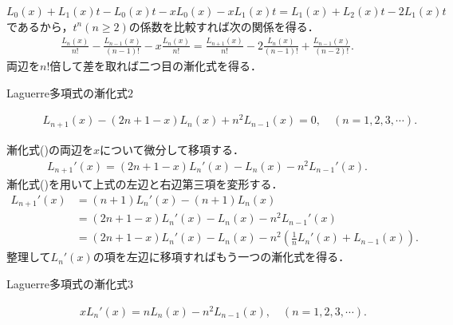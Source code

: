 \documentclass[a4j,papersize,disablejfam,slide,14pt]{jsarticle}
\begin{document}
    $L_0(x) + L_1(x) t - L_0(x) t - x L_0(x) - x L_1(x)t = L_1(x) + L_2(x)t - 2L_1(x)t$であるから，$t^n(n \geq 2)$の係数を比較すれば次の関係を得る．
    \begin{align}
    	\frac{L_n(x)}{n!} - \frac{L_{n-1}(x)}{(n-1)!} - x \frac{L_n(x)}{n!} = \frac{L_{n+1}(x)}{n!} - 2 \frac{L_n(x)}{(n-1)!} + \frac{L_{n-1}(x)}{(n-2)!}.
    \end{align}
    両辺を$n!$倍して差を取れば二つ目の漸化式を得る．
    \begin{screen}
    	\begin{description}
        \item[{\rm Laguerre}多項式の漸化式$2$]
    		\begin{align}
    			L_{n+1}(x) - (2n+1-x) L_n(x) + n^2 L_{n-1}(x) = 0, \quad (n=1,2,3,\cdots). \label{eq:laguerre_recurrence2}
    		\end{align}
    	\end{description}
    \end{screen}
    漸化式()の両辺を$x$について微分して移項する．
    \begin{align}
    	L_{n+1}'(x) = (2n+1-x) L_n'(x) - L_n(x) - n^2 L_{n-1}'(x).
    \end{align}
    漸化式()を用いて上式の左辺と右辺第三項を変形する．
    \begin{align}
    	L_{n+1}'(x) &= (n+1)L_n'(x) - (n+1)L_n(x) \\
        &= (2n+1-x) L_n'(x) - L_n(x) - n^2 L_{n-1}'(x) \\
        &= (2n+1-x) L_n'(x) - L_n(x) - n^2 \left( \frac{1}{n}L_n'(x) + L_{n-1}(x) \right).
    \end{align}
    整理して$L_n'(x)$の項を左辺に移項すればもう一つの漸化式を得る．
    \begin{screen}
    	\begin{description}
        \item[{\rm Laguerre}多項式の漸化式$3$]
    		\begin{align}
    			xL_n'(x) = nL_n(x) - n^2 L_{n-1}(x), \quad (n=1,2,3,\cdots). \label{eq:laguerre_recurrence3}
    		\end{align}
    	\end{description}
    \end{screen}
    
\end{document}
